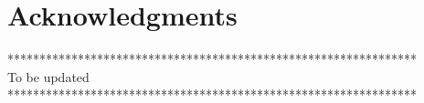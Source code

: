 
\chapter{Acknowledgments}



****************************************************************\\
To be updated \\
****************************************************************



